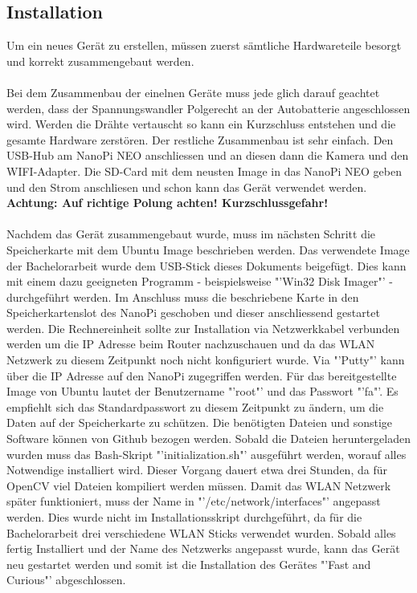 \subsection{Installation}
Um ein neues Gerät zu erstellen, müssen zuerst sämtliche Hardwareteile besorgt und korrekt zusammengebaut werden.\\\\

Bei dem Zusammenbau der einelnen Ger\"ate muss jede glich darauf geachtet werden, dass der Spannungswandler Polgerecht an der Autobatterie angeschlossen wird. Werden die Dr\"ahte vertauscht so kann ein Kurzschluss entstehen und die gesamte Hardware zerst\"oren. Der restliche Zusammenbau ist sehr einfach. Den USB-Hub am NanoPi NEO anschliessen und an diesen dann die Kamera und den WIFI-Adapter. Die SD-Card mit dem neusten Image in das NanoPi NEO geben und den Strom anschliesen und schon kann das Ger\"at verwendet werden.\\
\textbf{Achtung: Auf richtige Polung achten! Kurzschlussgefahr!}\\\\


Nachdem das Gerät zusammengebaut wurde, muss im nächsten Schritt die Speicherkarte mit dem Ubuntu Image beschrieben werden. Das verwendete Image der Bachelorarbeit wurde dem USB-Stick dieses Dokuments beigefügt. Dies kann mit einem dazu geeigneten Programm - beispielsweise "'Win32 Disk Imager"' - durchgeführt werden. Im Anschluss muss die beschriebene Karte in den Speicherkartenslot des NanoPi geschoben und dieser anschliessend gestartet werden. Die Rechnereinheit sollte zur Installation via Netzwerkkabel verbunden werden um die IP Adresse beim Router nachzuschauen und da das WLAN Netzwerk zu diesem Zeitpunkt noch nicht konfiguriert wurde. Via "'Putty"' kann über die IP Adresse auf den NanoPi zugegriffen werden. Für das bereitgestellte Image von Ubuntu lautet der Benutzername "'root"' und das Passwort "'fa"'. Es empfiehlt sich das Standardpasswort zu diesem Zeitpunkt zu ändern, um die Daten auf der Speicherkarte zu schützen. Die benötigten Dateien und sonstige Software können von Github bezogen werden. Sobald die Dateien heruntergeladen wurden muss das Bash-Skript "'initialization.sh"' ausgeführt werden, worauf alles Notwendige installiert wird. Dieser Vorgang dauert etwa drei Stunden, da für OpenCV viel Dateien kompiliert werden müssen.
Damit das WLAN Netzwerk später funktioniert, muss der Name in "'/etc/network/interfaces"' angepasst werden. Dies wurde nicht im Installationsskript durchgeführt, da für die Bachelorarbeit drei verschiedene WLAN Sticks verwendet wurden. Sobald alles fertig Installiert und der Name des Netzwerks angepasst wurde, kann das Gerät neu gestartet werden und somit ist die Installation des Gerätes "'Fast and Curious"' abgeschlossen.